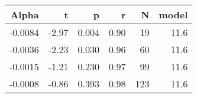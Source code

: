 \begin{table}[ht]
\centering
\begin{tabular}{rrrrrr}
  \hline
Alpha & t & p & r & N & model \\ 
  \hline
-0.0084 & -2.97 & 0.004 & 0.90 & 19 & 11.6 \\ 
  -0.0036 & -2.23 & 0.030 & 0.96 & 60 & 11.6 \\ 
  -0.0015 & -1.21 & 0.230 & 0.97 & 99 & 11.6 \\ 
  -0.0008 & -0.86 & 0.393 & 0.98 & 123 & 11.6 \\ 
   \hline
\end{tabular}
\end{table}

